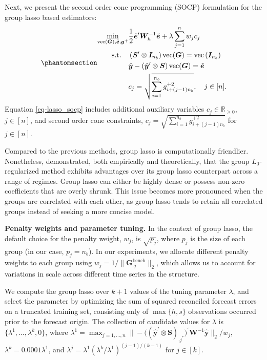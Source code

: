 \documentclass[
  11pt]{article}
\theoremstyle{plain}
\theoremstyle{remark}
\begin{document}
Next, we present the second order cone programming (SOCP) formulation
for the group lasso based estimators:
\begin{equation}\phantomsection\label{eq-lasso_socp}{
\begin{aligned}
\min_{\operatorname{vec}(\bm{G}), \check{\bm{e}}, \bm{g}^{+}} & \frac{1}{2}\check{\bm{e}}^{\prime} \bm{W}_h^{-1}\check{\bm{e}} + \lambda \sum_{j=1}^n w_j c_j \\
\text{s.t.} \quad & \left(\bm{S}^{\prime} \otimes \bm{I}_{n_b}\right) \operatorname{vec}(\bm{G})=\operatorname{vec}\left(\bm{I}_{n_b}\right) \\
& \hat{\bm{y}}-\left(\hat{\bm{y}}^{\prime} \otimes \bm{S}\right) \operatorname{vec}(\bm{G}) = \check{\bm{e}} \\
& c_j = \sqrt{\sum_{i=1}^{n_b} g_{i + (j-1) n_b}^{+2}}, \quad j \in[n].
\end{aligned}
}\end{equation} Equation \eqref{eq-lasso_socp} includes additional
auxiliary variables \(c_j \in \mathbb{R}_{\geq 0}\), \(j \in [n]\), and
second order cone constraints,
\(c_j = \sqrt{\sum_{i=1}^{n_b} g_{i + (j-1) n_b}^{+2}}\) for
\(j \in[n]\).

Compared to the previous methods, group lasso is computationally
friendlier. Nonetheless, \citet{Hazimeh2023-ie} demonstrated, both
empirically and theoretically, that the group \(L_0\)-regularized method
exhibits advantages over its group lasso counterpart across a range of
regimes. Group lasso can either be highly dense or possess non-zero
coefficients that are overly shrunk. This issue becomes more pronounced
when the groups are correlated with each other, as group lasso tends to
retain all correlated groups instead of seeking a more concise model.

\textbf{Penalty weights and parameter tuning.} In the context of group
lasso, the default choice for the penalty weight, \(w_j\), is
\(\sqrt{p_j}\), where \(p_j\) is the size of each group (in our case,
\(p_j = n_b\)). In our experiments, we allocate different penalty
weights to each group using
\(w_j = 1/\|\bm{G}_{\cdot j}^{\text{bench}}\|_2\), which allows us to
account for variations in scale across different time series in the
structure.

We compute the group lasso over \(k+1\) values of the tuning parameter
\(\lambda\), and select the parameter by optimizing the sum of squared
reconciled forecast errors on a truncated training set, consisting only
of \(\max\{h, s\}\) observations occurred prior to the forecast origin.
The collection of candidate values for \(\lambda\) is
\(\{\lambda^{1},\dots,\lambda^{k}, 0\}\), where
\(\lambda^{1} = \max_{j=1, \ldots, n}\big\|-\big((\hat{\bm{y}}^{\prime} \otimes \bm{S})_{\cdot j^{*}}\big)^{\prime} \bm{W}^{-1} \hat{\bm{y}}\big\|_2 / w_j\),
\(\lambda^{k} = 0.0001\lambda^{1}\), and
\(\lambda^{j} = \lambda^{1}(\lambda^{k} / \lambda^{1})^{(j-1) / (k-1)}\)
for \(j \in [k]\).
\end{document}
